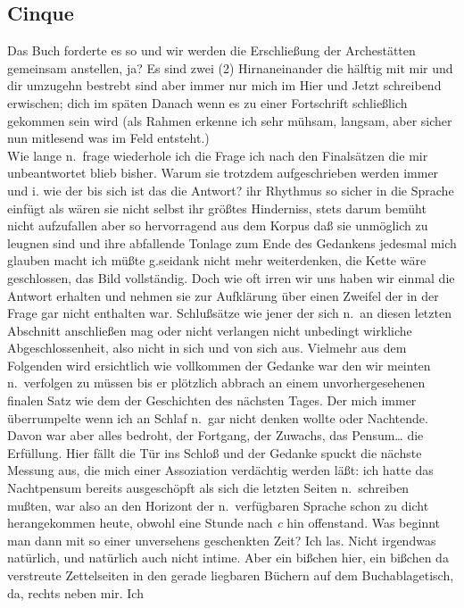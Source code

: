 \documentclass[
]{article}
\author{}
\date{\vspace{-2.5em}}
\begin{document}
\subsection{Cinque}\label{cinque}

Das Buch forderte es so und wir werden die Erschließung der Archestätten
gemeinsam anstellen, ja? Es sind zwei (2) Hirnaneinander die hälftig mit
mir und dir umzugehn bestrebt sind aber immer nur mich im Hier und Jetzt
schreibend erwischen; dich im späten Danach wenn es zu einer Fortschrift
schließlich gekommen sein wird (als Rahmen erkenne ich sehr mühsam,
langsam, aber sicher nun mitlesend was im Feld entsteht.)\\
Wie lange n.~frage wiederhole ich die Frage ich nach den Finalsätzen die
mir unbeantwortet blieb bisher. Warum sie trotzdem aufgeschrieben werden
immer und i. wie der bis sich ist das die Antwort? ihr Rhythmus so
sicher in die Sprache einfügt als wären sie nicht selbst ihr größtes
Hinderniss, stets darum bemüht nicht aufzufallen aber so hervorragend
aus dem Korpus daß sie unmöglich zu leugnen sind und ihre abfallende
Tonlage zum Ende des Gedankens jedesmal mich glauben macht ich müßte
g.seidank nicht mehr weiterdenken, die Kette wäre geschlossen, das Bild
vollständig. Doch wie oft irren wir uns haben wir einmal die Antwort
erhalten und nehmen sie zur Aufklärung über einen Zweifel der in der
Frage gar nicht enthalten war. Schlußsätze wie jener der sich n.~an
diesen letzten Abschnitt anschließen mag oder nicht verlangen nicht
unbedingt wirkliche Abgeschlossenheit, also nicht in sich und von sich
aus. Vielmehr aus dem Folgenden wird ersichtlich wie vollkommen der
Gedanke war den wir meinten n.~verfolgen zu müssen bis er plötzlich
abbrach an einem unvorhergesehenen finalen Satz wie dem der Geschichten
des nächsten Tages. Der mich immer überrumpelte wenn ich an Schlaf
n.~gar nicht denken wollte oder Nachtende. Davon war aber alles bedroht,
der Fortgang, der Zuwachs, das Pensum\ldots{} die Erfüllung. Hier fällt
die Tür ins Schloß und der Gedanke spuckt die nächste Messung aus, die
mich einer Assoziation verdächtig werden läßt: ich hatte das Nachtpensum
bereits ausgeschöpft als sich die letzten Seiten n.~schreiben mußten,
war also an den Horizont der n.~verfügbaren Sprache schon zu dicht
herangekommen heute, obwohl eine Stunde nach \emph{c} hin offenstand.
Was beginnt man dann mit so einer unversehens geschenkten Zeit? Ich las.
Nicht irgendwas natürlich, und natürlich auch nicht intime. Aber ein
bißchen hier, ein bißchen da verstreute Zettelseiten in den gerade
liegbaren Büchern auf dem Buchablagetisch, da, rechts neben mir. Ich
\end{document}
